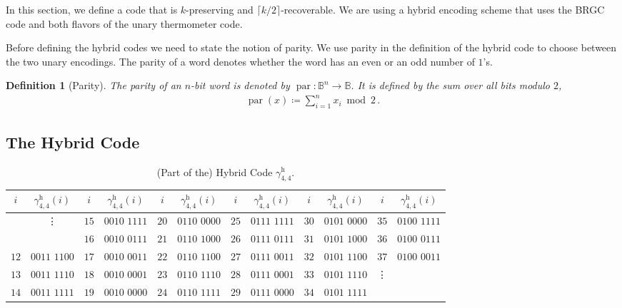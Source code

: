 \documentclass[9pt,journal,compsoc]{IEEEtran}
\newtheorem{definition}[theorem]{Definition}
\theoremstyle{remark}
\DeclareMathOperator{\parity}{par}
\newcommand{\IB}{\mathbb{B}}
\newcommand{\ceil}[1]{\lceil{#1}\rceil}
\newcommand{\gHyb}[1]{\gamma_{#1}^{\operatorname{h}}}
\begin{document}
In this section, we define a code that is $k$-preserving and
  $\ceil{k/2}$-recoverable.
We are using a hybrid encoding scheme that uses the BRGC code
  and both flavors of the unary thermometer code.

Before defining the hybrid codes we need to state the notion of parity.
We use parity in the definition of the hybrid code to choose between
the two unary encodings.
The parity of a word denotes whether the word has an even or an odd number
of $1$'s.

\begin{definition}[Parity]\label{def:parity}
  The parity of an $n$-bit word is denoted by $\parity\colon\IB^n\rightarrow\IB$.
  It is defined by the sum over all bits modulo $2$,
  \begin{align*}
    \parity(x)\coloneqq\sum^n_{i=1}x_i \bmod 2\,.
  \end{align*}
\end{definition}

\subsection{The Hybrid Code}

\begin{table}
  \caption{(Part of the) Hybrid Code $\gHyb{4,4}$.}\label{tab:hybrid}
  \centering
  \begin{tabular}{cccccccccccc}
    $i$ & $\gHyb{4,4}(i)$ & $i$ & $\gHyb{4,4}(i)$ & $i$ & $\gHyb{4,4}(i)$ & $i$ & $\gHyb{4,4}(i)$ & $i$ & $\gHyb{4,4}(i)$ & $i$ & $\gHyb{4,4}(i)$ \\ \hline
    & \multirow{2}{*}{\vdots} & $15$ & $0010$ $1111$ & $20$ & \cellcolor{Gray}$0110$ $0000$ & $25$ & \cellcolor{Gray}$0111$ $1111$ & $30$ & $0101$ $0000$ & $35$ & $0100$ $1111$ \\
    &  & $16$ & $0010$ $0111$ & $21$ & \cellcolor{Gray}$0110$ $1000$ & $26$ & \cellcolor{Gray}$0111$ $0111$ & $31$ & $0101$ $1000$ & $36$ & $0100$ $0111$\\
    $12$ & $0011$ $1100$ & $17$ & $0010$ $0011$ & $22$ & \cellcolor{Gray}$0110$ $1100$ & $27$ & \cellcolor{Gray}$0111$ $0011$ & $32$ & $0101$ $1100$ & $37$ & $0100$ $0011$\\
    $13$ & $0011$ $1110$ & $18$ & \cellcolor{Gray}$0010$ $0001$ & $23$ & $0110$ $1110$ & $28$ & \cellcolor{Gray}$0111$ $0001$ & $33$ & $0101$ $1110$ & \multirow{2}{*}{\vdots} \\
    $14$ & $0011$ $1111$ & $19$ & \cellcolor{Gray}$0010$ $0000$ & $24$ & $0110$ $1111$ & $29$ & \cellcolor{Gray}$0111$ $0000$ & $34$ & $0101$ $1111$ &
  \end{tabular}
\end{table}
\end{document}
